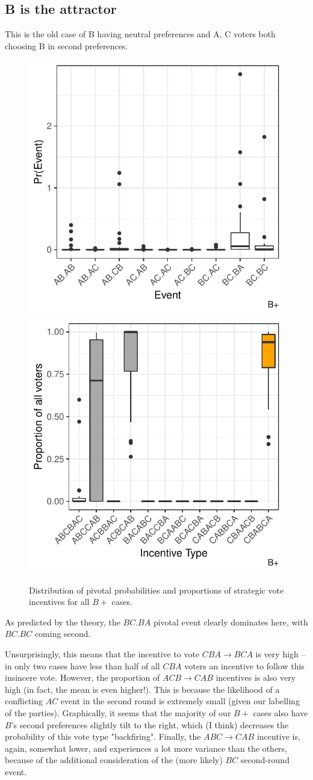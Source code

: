 \documentclass[11pt, letter, margin = 2 in]{article}
\begin{document}
\subsection{B is the attractor}

This is the old case of B having neutral preferences and A, C voters both choosing B in second preferences.

\begin{figure}[!htb]
	\centering
	\includegraphics[width = .45\textwidth]{../output/figures/prediction/pprob_sp_b.pdf}
	\includegraphics[width = .45\textwidth]{../output/figures/prediction/svinc_sp_b.pdf}
	\caption{Distribution of pivotal probabilities and proportions of strategic vote incentives for all $B+$ cases.}
	\label{fig:figure1}
\end{figure}

As predicted by the theory, the $BC.BA$ pivotal event clearly dominates here, with $BC.BC$ coming second.

Unsurprisingly, this means that the incentive to vote $CBA \rightarrow BCA$ is very high -- in only two cases have less than half of all $CBA$ voters an incentive to follow this insincere vote. However, the proportion of $ACB \rightarrow CAB$ incentives is also very high (in fact, the mean is even higher!). This is because the likelihood of a conflicting $AC$ event in the second round is extremely small (given our labelling of the parties). Graphically, it seems that the majority of our $B+$ cases also have $B$'s second preferences slightly tilt to the right, which (I think) decreases the probability of this vote type "backfiring". Finally, the $ABC \rightarrow CAB$ incentive is, again, somewhat lower, and experiences a lot more variance than the others, because of the additional consideration of the (more likely) $BC$ second-round event. 
\end{document}
